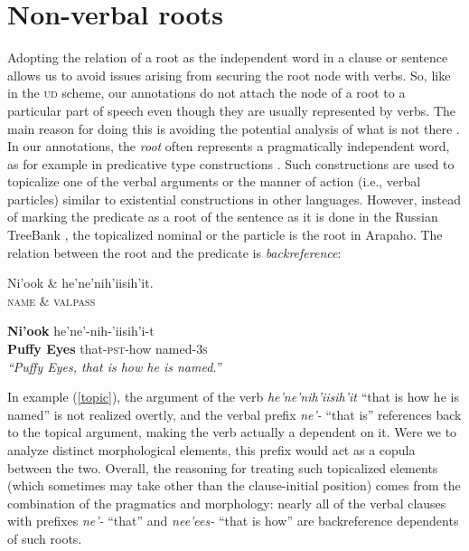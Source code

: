 \documentclass[11pt]{article}
\begin{document}
\section{Non-verbal roots} \label{backref}
Adopting the relation of a root as the independent word in a clause or sentence allows us to avoid issues arising from securing the root node with verbs. So, like in the \textsc{ud} scheme, our annotations do not attach the node of a root to a particular part of speech even though they are usually represented by verbs. The main reason for doing this is avoiding the potential analysis of what is not there \cite{Nivre2015,Hajicova2015,Osborne2015}. In our annotations, the \textit{root} often represents a pragmatically independent word, as for example in predicative type constructions \cite{Cow08}. Such constructions are used to topicalize one of the verbal arguments or the manner of action (i.e., verbal particles)
similar to existential constructions in other languages. However, instead of marking the predicate as a root of the sentence as it is done in the Russian TreeBank \cite{Marneffe2014}, the topicalized nominal or the particle is the root in Arapaho. The relation between the root and the predicate is \textit{backreference}:
\begin{exe}
\ex \label{topic}
\small
\begin{dependency}
\begin{deptext}
Ni'ook \& he'ne'nih'iisih'it.\\
\textsc{name} \& \textsc{vai.pass}\\
\end{deptext}
\end{dependency}
\begin{adjustwidth*}{-0.2in}{-0.2in}
\gll \textbf{{Ni'ook}} {he'ne'-nih-'iisih'i-t}\\
\textbf{{Puffy Eyes}} {that-\textsc{pst}-how named-\textsc{3s}}\\
\trans \textit{``Puffy Eyes, that is how he is named.''}
\end{adjustwidth*}
\end{exe}
\normalsize
In example (\ref{topic}), the argument of the verb \textit{he'ne'nih'iisih'it} ``that is how he is named'' is not realized overtly, and the verbal prefix \textit{ne'-} ``that is'' references back to the topical argument, making the verb actually a dependent on it. Were we to analyze distinct morphological elements, this prefix would act as a copula between the two. Overall, the reasoning for treating such topicalized elements (which sometimes may take other than the clause-initial position) comes from the combination of the pragmatics and morphology: nearly all of the verbal clauses with prefixes \textit{ne'-} ``that'' and \textit{nee'ees-} ``that is how'' are backreference dependents of such roots. 
\end{document}
